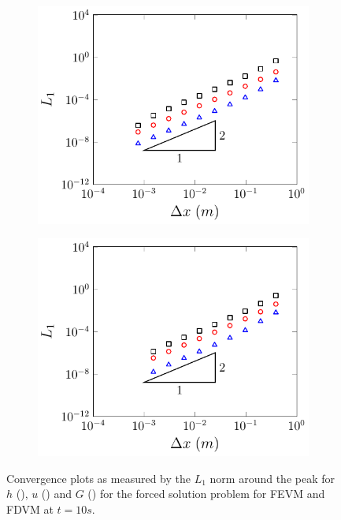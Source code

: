 \begin{figure}
	\centering
	\begin{subfigure}{0.5\textwidth}
		\includegraphics[width=\textwidth]{./chp5/figures/Forced/Dry/P2P/FEVML1red.pdf}
		\vspace{0.5cm}
	\end{subfigure}%
	\begin{subfigure}{0.5\textwidth}
		\includegraphics[width=\textwidth]{./chp5/figures/Forced/Dry/P2P/FDVML1red.pdf}
		\vspace{0.5cm}
	\end{subfigure}
	\caption{Convergence plots as measured by the $L_1$ norm around the peak for $h$ (), $u$ () and $G$ () for the forced solution problem for FEVM and FDVM at $t=10s$.}
	\label{fig:ForcedSolDryL1restrict}
\end{figure}
